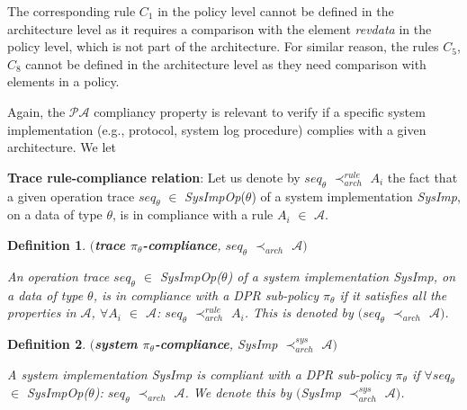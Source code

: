 \documentclass[a4paper]{article}
\newtheorem{ttd}{Definition}
\begin{document}
The corresponding rule $C_1$ in the policy level cannot be defined in the architecture level as it requires a comparison with the element \textit{revdata} in the policy level, which is not part of the architecture. For similar reason, the rules $C_5$, $C_8$ cannot be defined in the architecture level as they need comparison with elements in a policy.



Again, the $\mathcal{P}\mathcal{A}$ compliancy property is relevant to verify if a specific system implementation (e.g., protocol, system log procedure) complies with a given architecture. We let 

\begin{center}
\noindent{}
\end{center} 

\noindent \textbf{Trace rule-compliance relation}: Let us denote by $\textit{seq}_{\theta}$ $\prec^{rule}_{arch}$ $A_i$ the fact that a given operation trace $\textit{seq}_{\theta}$ $\in$ \textit{SysImpOp}($\theta$) of a system implementation \textit{SysImp}, on a data of type $\theta$, is in compliance with a rule $A_i$ $\in$ $\mathcal{A}$.  


\begin{ttd}$($\textbf{trace $\pi_{\theta}$-compliance}, $\textit{seq}_{\theta}$ $\prec_{arch}$ $\mathcal{A}$$)$

\noindent An operation trace $\textit{seq}_{\theta}$ $\in$ \textit{SysImpOp}($\theta$) of a system implementation \textit{SysImp}, on a data of type $\theta$, is in compliance with a DPR sub-policy $\pi_{\theta}$ if it satisfies all the properties in $\mathcal{A}$, $\forall$$A_i$ $\in$ $\mathcal{A}$: $\textit{seq}_{\theta}$ $\prec^{rule}_{arch}$ $A_i$.  This is denoted by $($$\textit{seq}_{\theta}$ $\prec_{arch}$ $\mathcal{A}$$)$.  
\end{ttd} 

 
\begin{ttd}$($\textbf{system $\pi_{\theta}$-compliance}, \textit{SysImp} $\prec^{sys}_{arch}$ $\mathcal{A}$$)$

\noindent A system implementation \textit{SysImp} is compliant with a DPR sub-policy $\pi_{\theta}$ if $\forall$$\textit{seq}_{\theta}$ $\in$ \textit{SysImpOp}($\theta$): $\textit{seq}_{\theta}$ $\prec_{arch}$ $\mathcal{A}$.  We denote this by $($\textit{SysImp} $\prec^{sys}_{arch}$ $\mathcal{A}$$)$.   
\end{ttd} 
\end{document}
